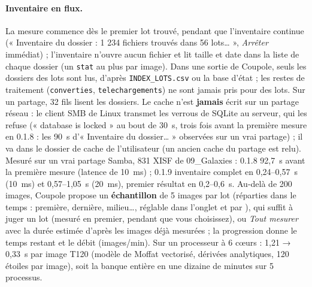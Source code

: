 \paragraph{Inventaire en flux.} La mesure commence dès le premier lot trouvé, pendant que l'inventaire continue
(« Inventaire du dossier : 1 234 fichiers trouvés dans 56 lots… », \emph{Arrêter} immédiat) ; l'inventaire n'ouvre
aucun fichier et lit taille et date dans la liste de chaque dossier (un \texttt{stat} au plus par image). Dans une
sortie de Coupole, seuls les dossiers des lots sont lus, d'après \texttt{INDEX\_LOTS.csv} ou la base d'état ; les
restes de traitement (\texttt{converties}, \texttt{telechargements}) ne sont jamais pris pour des lots. Sur un
partage, 32 fils lisent les dossiers. Le cache n'est \textbf{jamais} écrit sur un partage réseau : le client SMB de
Linux transmet les verrous de SQLite au serveur, qui les refuse (« database is locked » au bout de 30~s, trois fois
avant la première mesure en 0.1.8 : les 90~s d'« Inventaire du dossier… » observées sur un vrai partage) ; il va dans
le dossier de cache de l'utilisateur (un ancien cache du partage est relu). Mesuré sur un vrai partage Samba, 831
XISF de 09\_Galaxies : 0.1.8 92,7~s avant la première mesure (latence de 10~ms) ; 0.1.9 inventaire complet en
0,24–0,57~s (10~ms) et 0,57–1,05~s (20~ms), premier résultat en 0,2–0,6~s. Au-delà de 200 images, Coupole propose un \textbf{échantillon} de 5 images par lot (réparties dans
le temps : première, dernière, milieu…, réglable dans l'onglet et par ), qui suffit à juger un
lot (mesuré en premier, pendant que vous choisissez), ou \emph{Tout mesurer} avec la durée estimée d'après les
images déjà mesurées ; la progression donne le temps
restant et le débit (images/min). Sur un processeur à 6 cœurs : 1,21 → 0,33~s par image T120
(modèle de Moffat vectorisé, dérivées analytiques, 120 étoiles par image), soit la banque entière en une dizaine de
minutes sur 5 processus.

